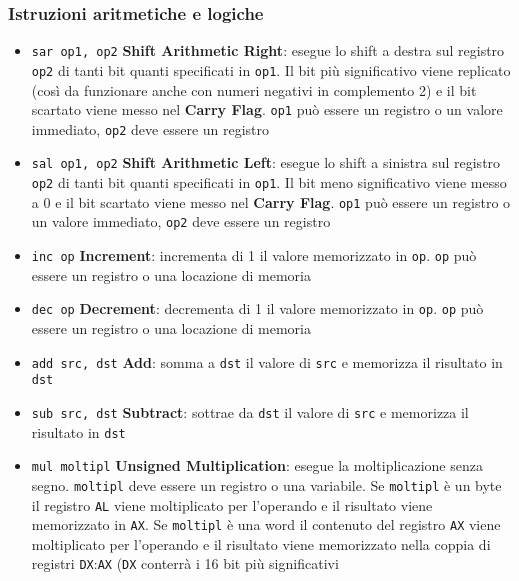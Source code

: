 \documentclass[a4paper]{article}
\theoremstyle{break}
\theoremstyle{break}
\theoremstyle{break}
\theoremstyle{break}
\begin{document}
\subsubsection{Istruzioni aritmetiche e logiche}
\begin{itemize}
	\item \texttt{sar op1, op2} \quad \textbf{Shift Arithmetic Right}: esegue lo shift a destra sul
	      registro \texttt{op2} di tanti bit quanti specificati in \texttt{op1}. Il bit
	      più significativo viene replicato (così da funzionare anche
	      con numeri negativi in complemento 2) e il bit scartato
	      viene messo nel \textbf{Carry Flag}. \texttt{op1} può essere un registro
	      o un valore immediato, \texttt{op2} deve essere un registro
	\item \texttt{sal op1, op2} \quad \textbf{Shift Arithmetic Left}: esegue lo shift a sinistra sul
	      registro \texttt{op2} di tanti bit quanti specificati in \texttt{op1}. Il bit
	      meno significativo viene messo a \( 0 \)  e il bit scartato viene
	      messo nel \textbf{Carry Flag}. \texttt{op1} può essere un registro o un
	      valore immediato, \texttt{op2} deve essere un registro
	\item \texttt{inc op} \quad \textbf{Increment}: incrementa di 1 il valore memorizzato in
	      \texttt{op}. \texttt{op} può essere un registro o una locazione di memoria
	\item \texttt{dec op} \quad \textbf{Decrement}: decrementa di 1 il valore memorizzato in
	      \texttt{op}. \texttt{op} può essere un registro o una locazione di
	      memoria
	\item \texttt{add src, dst} \quad \textbf{Add}: somma a \texttt{dst} il valore di \texttt{src}
	      e memorizza il risultato in \texttt{dst}
	\item \texttt{sub src, dst} \quad \textbf{Subtract}: sottrae da \texttt{dst} il valore di \texttt{src}
	      e memorizza il risultato in \texttt{dst}
	\item \texttt{mul moltipl} \quad \textbf{Unsigned Multiplication}: esegue la moltiplicazione
	      senza segno. \texttt{moltipl} deve essere un registro o una
	      variabile. Se \texttt{moltipl} è un byte il registro \texttt{AL} viene
	      moltiplicato per l'operando e il risultato viene
	      memorizzato in \texttt{AX}. Se \texttt{moltipl} è una word il
	      contenuto del registro \texttt{AX} viene moltiplicato per
	      l'operando e il risultato viene memorizzato nella coppia
	      di registri \texttt{DX}:\texttt{AX} (\texttt{DX} conterrà i 16 bit più significativi

\end{itemize}
\end{document}
